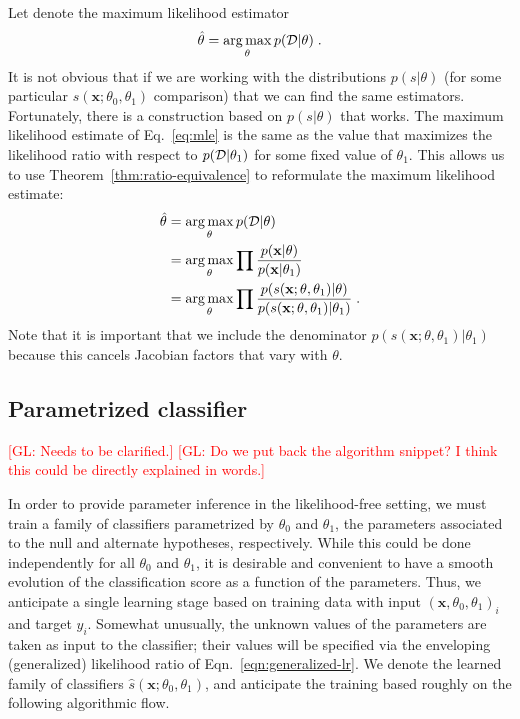 \documentclass[12pt]{article}
\DeclareMathOperator*{\argmax}{arg\,max}
\numberwithin{equation}{section}
\theoremstyle{plain}
\newcommand{\glnote}[1]{\textcolor{red}{[GL: #1]}}
\begin{document}
Let denote the maximum likelihood estimator
\begin{equation}\label{eq:mle}
\hat{\theta} = \argmax_\theta  p({\cal D} | \theta) \; .
\end{equation}
It is not obvious that if we are working with the distributions $p(s|\theta)$
(for some particular $s(\mathbf{x}; \theta_0, \theta_1)$ comparison) that we can find the
same estimators. Fortunately, there is a construction based on $p(s|\theta)$
that works. The maximum likelihood estimate of Eq.~\ref{eq:mle} is the same as
the value that maximizes the likelihood ratio with respect to $p({\cal
D}|\theta_1)$ for some fixed value of $\theta_1$. This allows us to use
Theorem~\ref{thm:ratio-equivalence} to reformulate the maximum likelihood estimate:
\begin{align}\label{eq:mle_withs}
\hat{\theta} &= \argmax_\theta  p({\cal D} | \theta) \nonumber \\
&= \argmax_\theta  \prod \frac{p(\mathbf{x}| \theta)}{p(\mathbf{x}|\theta_1)} \nonumber \\
&= \argmax_\theta  \prod \frac{p(s(\mathbf{x}; \theta, \theta_1) | \theta)}{p(s(\mathbf{x}; \theta, \theta_1) |\theta_1)} \; .
\end{align}
Note that it is important that we include the denominator $p(s(\mathbf{x}; \theta, \theta_1)
|\theta_1)$ because this cancels Jacobian factors that vary with $\theta$.

\subsection{Parametrized classifier}

\glnote{Needs to be clarified.}
\glnote{Do we put back the algorithm snippet? I think this could be directly
explained in words.}

In order to provide parameter inference in the likelihood-free setting, we must
train a family of classifiers parametrized by $\theta_0$ and $\theta_1$, the
parameters associated to the null and alternate hypotheses, respectively. While
this could be done independently for all $\theta_0$ and $\theta_1$, it is
desirable and convenient to have a smooth evolution of the classification score
as a function of the parameters. Thus, we anticipate a single learning stage
based on training data with input $(\mathbf{x}, \theta_0, \theta_1)_i$ and target $y_i$.
Somewhat unusually, the unknown values of the parameters are taken as input to
the classifier; their values will be specified via the enveloping (generalized)
likelihood ratio of Eqn.~\ref{eqn:generalized-lr}. We denote the learned family of
classifiers $\hat{s}(\mathbf{x}; \theta_0, \theta_1)$, and anticipate the training based
roughly on the following algorithmic flow.
\end{document}

